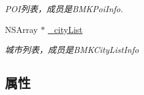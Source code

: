 \begin{DoxyCompactItemize}
\begin{DoxyCompactList}\small\item\em P\+O\+I列表，成员是\+B\+M\+K\+Poi\+Info. \end{DoxyCompactList}\item 
\hypertarget{interface_b_m_k_poi_result_acf4e2c4c0040c79368d2da36bfd7c092}{N\+S\+Array $\ast$ \hyperlink{interface_b_m_k_poi_result_acf4e2c4c0040c79368d2da36bfd7c092}{\+\_\+city\+List}}\label{interface_b_m_k_poi_result_acf4e2c4c0040c79368d2da36bfd7c092}

\begin{DoxyCompactList}\small\item\em 城市列表，成员是\+B\+M\+K\+City\+List\+Info \end{DoxyCompactList}\end{DoxyCompactItemize}
\subsection*{属性}
